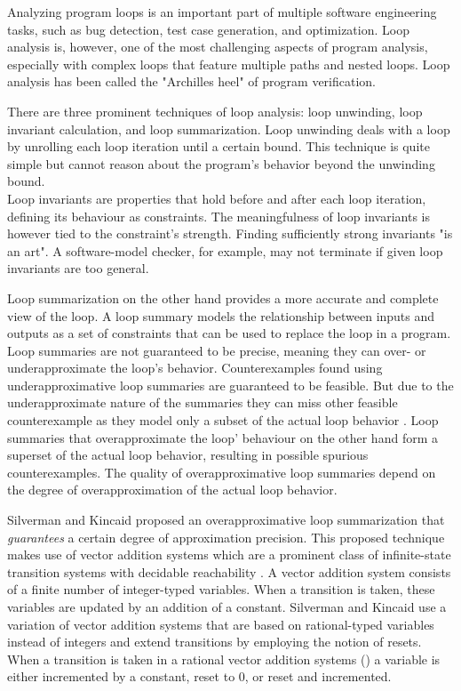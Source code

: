 Analyzing program loops is an important part of multiple software engineering tasks, such as bug detection, test case generation, and optimization. Loop analysis is, however, one of the most challenging aspects of program analysis, especially with complex loops that feature multiple paths and nested loops. Loop analysis has been called the "Archilles heel" of program verification\cite{DBLP:journals/fmsd/KroeningSTTW13}. \par
There are three prominent techniques of loop analysis: loop unwinding, loop invariant calculation, and loop summarization\cite{DBLP:journals/fmsd/KroeningSTTW13 , DBLP:conf/cav/SilvermanK19, DBLP:journals/tse/XieCZLLL19}. Loop unwinding deals with a loop by unrolling each loop iteration until a certain bound. This technique is quite simple but cannot reason about the program's behavior beyond the unwinding bound. \\
Loop invariants are properties that hold before and after each loop iteration, defining its behaviour as constraints. The meaningfulness of loop invariants is however tied to the constraint's strength. Finding sufficiently strong invariants "is an art"\cite{DBLP:journals/fmsd/KroeningSTTW13}. A software-model checker, for example, may not terminate if given loop invariants are too general. \par
Loop summarization on the other hand provides a more accurate and complete view of the loop. A loop summary models the relationship between inputs and outputs as a set of constraints that can be used to replace the loop in a program. Loop summaries are not guaranteed to be precise, meaning they can over- or underapproximate the loop's behavior. Counterexamples found using underapproximative loop summaries are guaranteed to be feasible. But due to the underapproximate nature of the summaries they can miss other feasible counterexample as they model only a subset of the actual loop behavior \cite{DBLP:journals/fmsd/KroeningLW15}. Loop summaries that overapproximate the loop' behaviour on the other hand form a superset of the actual loop behavior, resulting in possible spurious counterexamples. The quality of overapproximative loop summaries depend on the degree of overapproximation of the actual loop behavior.\\ \par
Silverman and Kincaid\cite{DBLP:conf/cav/SilvermanK19} proposed an overapproximative loop summarization that \textsl{guarantees} a certain degree of approximation precision.
This proposed technique makes use of vector addition systems which are a prominent class of infinite-state transition systems with decidable reachability \cite{DBLP:conf/rp/HaaseH14}. A vector addition system consists of a finite number of integer-typed variables. When a transition is taken, these variables are updated by an addition of a constant. Silverman and Kincaid use a variation of vector addition systems that are based on rational-typed variables instead of integers and extend transitions by employing the notion of resets. When a transition is taken in a rational vector addition systems (\qvasr) a variable is either incremented by a constant, reset to 0, or reset and incremented.\\ \par

